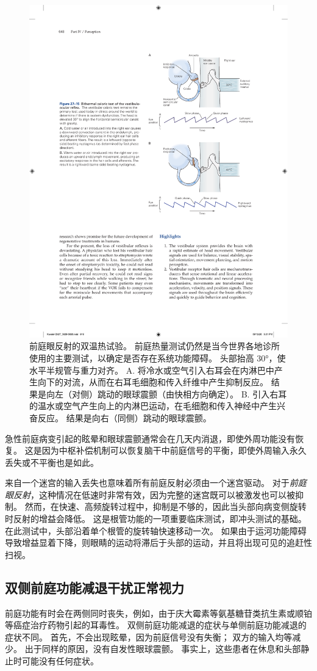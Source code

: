 \begin{figure}[htbp]
	\centering
	\includegraphics[width=0.6\linewidth]{chap27/fig_27_15}
	\caption{前庭眼反射的双温热试验。 前庭热量测试仍然是当今世界各地诊所使用的主要测试，以确定是否存在系统功能障碍。 头部抬高 30°，使水平半规管与重力对齐。 A. 将冷水或空气引入右耳会在内淋巴中产生向下的对流，从而在右耳毛细胞和传入纤维中产生抑制反应。 结果是向左（对侧）跳动的眼球震颤（由快相方向确定）。 B. 引入右耳的温水或空气产生向上的内淋巴运动，在毛细胞和传入神经中产生兴奋反应。 结果是向右（同侧）跳动的眼球震颤。}
	\label{fig:27_15}
\end{figure}


急性前庭病变引起的眩晕和眼球震颤通常会在几天内消退，即使外周功能没有恢复。
这是因为中枢补偿机制可以恢复脑干中前庭信号的平衡，即使外周输入永久丢失或不平衡也是如此。


来自一个迷宫的输入丢失也意味着所有前庭反射必须由一个迷宫驱动。
对于\textit{前庭眼反射}，这种情况在低速时非常有效，因为完整的迷宫既可以被激发也可以被抑制。
然而，在快速、高频旋转过程中，抑制是不够的，因此当头部向病变侧旋转时反射的增益会降低。
这是根管功能的一项重要临床测试，即冲头测试的基础。
在此测试中，头部沿着单个根管的旋转轴快速移动一次。
如果由于运河功能障碍导致增益显着下降，则眼睛的运动将滞后于头部的运动，并且将出现可见的追赶性扫视。



\subsection{双侧前庭功能减退干扰正常视力}

前庭功能有时会在两侧同时丧失，例如，由于庆大霉素等氨基糖苷类抗生素或顺铂等癌症治疗药物引起的耳毒性。
双侧前庭功能减退的症状与单侧前庭功能减退的症状不同。
首先，不会出现眩晕，因为前庭信号没有失衡；
双方的输入均等减少。
出于同样的原因，没有自发性眼球震颤。
事实上，这些患者在休息和头部静止时可能没有任何症状。


